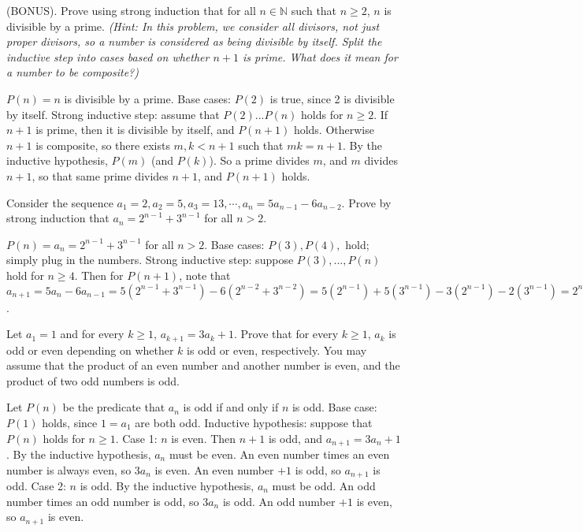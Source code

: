 \documentclass[solution, letterpaper]{cs20}
\begin{document}
        \problem{}{}

        (BONUS). Prove using strong induction that for all $n \in \mathbb{N}$ such that $n \ge 2$, $n$ is divisible by a prime. {\em (Hint: In this problem, we consider all divisors, not just proper divisors, so a number is considered as being divisible by itself.  Split the inductive step into cases based on whether $n+1$ is prime.  What does it mean for a number to be composite?)}

        \begin{solution}

        $P(n) = n$ is divisible by a prime. Base cases: $P(2)$ is true, since 2 is divisible by itself. Strong inductive step: assume that $P(2)...P(n)$ holds for $n \ge 2$. If $n+1$ is prime, then it is divisible by itself, and $P(n+1)$ holds. Otherwise $n+1$ is composite, so there exists  $m, k < n+1$ such that $mk = n+1$. By the inductive hypothesis, $P(m)$ (and $P(k)$). So a prime divides $m$, and $m$ divides $n+1$, so that same prime divides $n+1$, and $P(n+1)$ holds.

        \end{solution}

        \problem{}{} Consider the sequence $a_1= 2, a_2= 5, a_3= 13, \cdots , a_{n} = 5a_{n-1} - 6 a_{n-2}$.
        Prove by strong induction that $a_n = 2^{n-1} + 3^{n-1}$ for all $n > 2$.

        \begin{solution}

        $P(n) = a_n = 2^{n-1} + 3^{n-1}$ for all $n > 2$. Base cases: $P(3), P(4), $ hold; simply plug in the numbers. Strong inductive step: suppose $P(3), ..., P(n)$ hold for $n \ge 4$. Then for $P(n+1)$, note that $a_{n+1} = 5a_{n} - 6 a_{n-1} = 5(2^{n-1} + 3^{n-1}) - 6(2^{n-2} + 3^{n-2}) = 5(2^{n-1}) + 5(3^{n-1}) - 3(2^{n-1}) - 2(3^{n-1}) = 2^n + 3^n$.

        \end{solution}

        \problem{}{}
        Let $a_1=1$ and for every $k \geq 1$, $a_{k+1}=3a_k+1$. Prove that for every $k \geq1 $, $a_k$ is odd or even depending on whether $k$ is odd or even, respectively. You may assume that the product of an even number and another number is even, and the product of two odd numbers is odd.

        \begin{solution}
        Let $P(n)$ be the predicate that $a_n$ is odd if and only if $n$ is odd. Base case: $P(1)$ holds, since $1 = a_1$ are both odd. Inductive hypothesis: suppose that $P(n)$ holds for $n \ge 1$. Case 1: $n$ is even. Then $n+1$ is odd, and $a_{n+1} = 3a_n + 1$. By the inductive hypothesis, $a_n$ must be even. An even number times an even number is always even, so $3a_n$ is even. An even number $+1$ is odd, so $a_{n+1}$ is odd. Case 2: $n$ is odd. By the inductive hypothesis, $a_n$ must be odd. An odd number times an odd number is odd, so $3a_n$ is odd. An odd number $+1$ is even, so $a_{n+1}$ is even.
        \end{solution}
\end{document}
